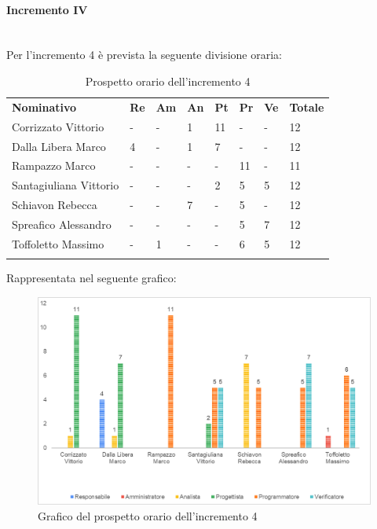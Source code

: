 \paragraph{Incremento IV} \mbox{} \\
Per l'incremento 4 è prevista la seguente divisione oraria:
\begin{longtable} {				
		>{}p{40mm}  
		>{}p{8mm}
		>{}p{8mm}
		>{}p{8mm}
		>{}p{8mm}
		>{}p{8mm}
		>{}p{8mm}
		>{}p{12mm}				
	}			
	\rowcolor{gray!50}
	\textbf{Nominativo} & \textbf{Re} & \textbf{Am} & \textbf{An} & \textbf{Pt} & \textbf{Pr} & \textbf{Ve} & \textbf{Totale}	\TBstrut \\ [2mm]
	Corrizzato Vittorio & - & - & 1 & 11 & - & - & 12 \TBstrut \\ [2mm]
	Dalla Libera Marco & 4 & - & 1 & 7 & - & - & 12 \TBstrut \\ [2mm]
	Rampazzo Marco & - & - & - & - & 11 & - & 11 \TBstrut \\ [2mm]
	Santagiuliana Vittorio & - & - & - & 2 & 5 & 5 & 12 \TBstrut \\ [2mm]
	Schiavon Rebecca & - & - & 7 & - & 5 & - & 12 \TBstrut \\ [2mm]
	Spreafico Alessandro & - & - & - & - & 5 & 7 & 12 \TBstrut \\ [2mm]
	Toffoletto Massimo & - & 1 & - & - & 6 & 5 & 12 \TBstrut \\ [2mm]
	\rowcolor{white}
	\caption{Prospetto orario dell'incremento 4}
\end{longtable}
Rappresentata nel seguente grafico: \mbox{}
\begin{figure} [H]
	\includegraphics[width=\linewidth]{./img/Grafici/18.png}
	\caption{Grafico del prospetto orario dell'incremento 4}
\end{figure}
